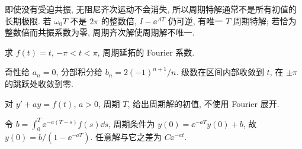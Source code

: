 即使没有受迫共振, 无阻尼齐次运动不会消失, 所以周期特解通常不是所有初值的长期极限. 若 $\omega_0T$ 不是 $2\pi$ 的整数倍, $I-\ee^{AT}$ 仍可逆, 有唯一 $T$ 周期特解; 若恰为整数倍而共振系数为零, 周期齐次解使周期解不唯一.
\begin{exercise}求 $f(t)=t$, $-\pi<t<\pi$, 周期延拓的 Fourier 系数.\end{exercise}
\begin{solution}奇性给 $a_n=0$, 分部积分给 $b_n=2(-1)^{n+1}/n$. 级数在区间内部收敛到 $t$, 在 $\pm\pi$ 的跳跃处收敛到零.\end{solution}
\begin{exercise}对 $y'+ay=f(t)$, $a>0$, 周期 $T$, 给出周期解的初值, 不使用 Fourier 展开.\end{exercise}
\begin{solution}令 $b=\int_0^T\ee^{-a(T-s)}f(s)\dd s$, 周期条件为 $y(0)=\ee^{-aT}y(0)+b$, 故 $y(0)=b/(1-\ee^{-aT})$. 任意解与它之差为 $C\ee^{-at}$.\end{solution}
